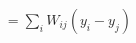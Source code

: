 \documentclass[preview]{standalone}
\begin{document}
\begin{align*}
= \sum_i W_{ij}(y_i - y_j)
\end{align*}
\end{document}

